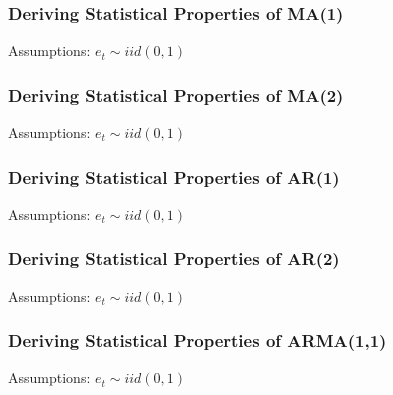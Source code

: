 \documentclass[11pt]{article}
\begin{document}
\subsubsection{Deriving Statistical Properties of MA(1)}
Assumptions: $e_t \sim iid(0,1)$ 

\subsubsection{Deriving Statistical Properties of MA(2)}
Assumptions: $e_t \sim iid(0,1)$ 

\subsubsection{Deriving Statistical Properties of AR(1)}
Assumptions: $e_t \sim iid(0,1)$ 

\subsubsection{Deriving Statistical Properties of AR(2)}
Assumptions: $e_t \sim iid(0,1)$ 
\subsubsection{Deriving Statistical Properties of ARMA(1,1)}
Assumptions: $e_t \sim iid(0,1)$ 
\end{document}
